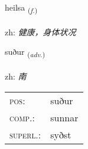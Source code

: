 \documentclass[frontgrid, backgrid]{flacards}\usepackage[]{graphicx}\usepackage[]{color}
\begin{document}
\renewcommand{\flhead}{\vskip5pt \fboxsep=0pt {\small\bfseries\footnotesize Nafnorð | 名词}}
\renewcommand{\fcfoot}{\vskip5pt \fboxsep=0pt \hspace{2pt}{\small\bfseries\footnotesize 2K}}

\renewcommand{\blhead}{\vskip5pt {\small\bfseries\footnotesize Nafnorð | 名词 }}
\renewcommand{\bcfoot}{\vskip5pt \hspace{2pt}{\small\bfseries\footnotesize 2K}}


{heilsa \small{\textsubscript{(\textit{f.})}} \\[1ex] %
\textphonetic{[heilsa]} \\
zh: \emph{健康，身体状况} \\  [2ex]
\renewcommand*{\arraystretch}{0.8}
}

\renewcommand{\flhead}{\vskip5pt \fboxsep=0pt {\small\bfseries\footnotesize Atviksorð | 副词}}
\renewcommand{\fcfoot}{\vskip5pt \fboxsep=0pt \hspace{2pt}{\small\bfseries\footnotesize 2K}}

\renewcommand{\blhead}{\vskip5pt {\small\bfseries\footnotesize Atviksorð | 副词 }}
\renewcommand{\bcfoot}{\vskip5pt \hspace{2pt}{\small\bfseries\footnotesize 2K}}


{suður \small{\textsubscript{(\textit{adv.})}} \\[1ex] %
\textphonetic{[sʏːðʏr]} \\
zh: \emph{南} \\  [2ex]
\renewcommand*{\arraystretch}{0.8}
\begin{tabular}{ll}
\textsc{pos}: & suður \\ 
\textsc{comp.}: & sunnar \\ 
\textsc{superl.}: & syðst \\
\end{tabular}
}
\end{document}
